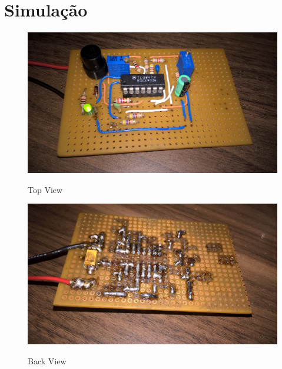 \documentclass[titlepage, a4paper, 10pt, reqno, openany]{report}
\begin{document}
\section{Simulação}
\begin{figure}[H]
	\centering
	\includegraphics[scale=0.15]{./image/placa_1.jpg}\\
	\caption{Top View}
\end{figure}
\begin{figure}[H]
	\centering
	\includegraphics[scale=0.15]{./image/placa_2.jpg}\\
	\caption{Back View}
\end{figure}\par
\end{document}
